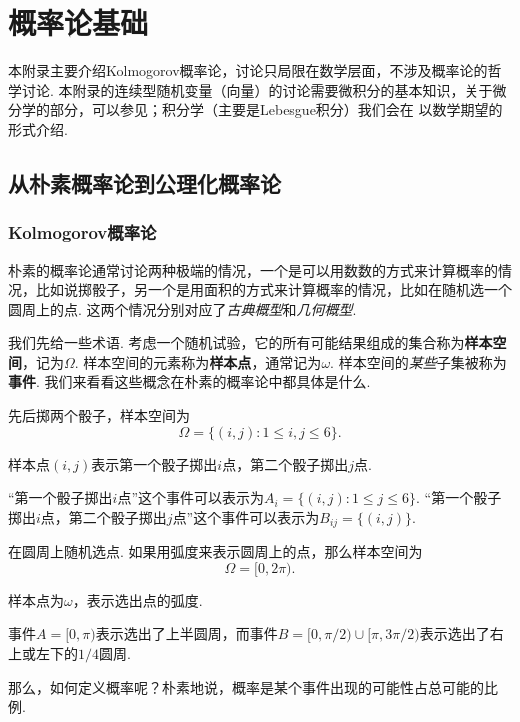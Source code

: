\chapter{概率论基础}\label{chap:prob}

本附录主要介绍Kolmogorov概率论，讨论只局限在数学层面，不涉及概率论的哲学讨论. 本附录的连续型随机变量（向量）的讨论需要微积分的基本知识，关于微分学的部分，可以参见；积分学（主要是Lebesgue积分）我们会在 以数学期望的形式介绍. 

\section{从朴素概率论到公理化概率论}

\subsection{Kolmogorov概率论}\label{subsec:kolmogorov-probability}
朴素的概率论通常讨论两种极端的情况，一个是可以用数数的方式来计算概率的情况，比如说掷骰子，另一个是用面积的方式来计算概率的情况，比如在随机选一个圆周上的点. 这两个情况分别对应了\textit{古典概型}和\textit{几何概型}. 

我们先给一些术语. 考虑一个随机试验，它的所有可能结果组成的集合称为\textbf{样本空间}，记为$\Omega$. 样本空间的元素称为\textbf{样本点}，通常记为$\omega$. 样本空间的\textit{某些}子集被称为\textbf{事件}. 我们来看看这些概念在朴素的概率论中都具体是什么. 

\begin{example}[古典概型]
先后掷两个骰子，样本空间为
\[
    \Omega = \{ (i, j): 1 \leq i, j \leq 6 \}.
\]

样本点$(i, j)$表示第一个骰子掷出$i$点，第二个骰子掷出$j$点. 

“第一个骰子掷出$i$点”这个事件可以表示为$A_i = \{ (i, j): 1 \leq j \leq 6 \}$. “第一个骰子掷出$i$点，第二个骰子掷出$j$点”这个事件可以表示为$B_{ij} = \{ (i, j) \}$.
\end{example}

\begin{example}[几何概型]
在圆周上随机选点. 如果用弧度来表示圆周上的点，那么样本空间为
\[
    \Omega = [0, 2\pi).
\]

样本点为$\omega$，表示选出点的弧度. 

事件$A = [0, \pi)$表示选出了上半圆周，而事件$B = [0, \pi/2)\cup[\pi, 3\pi/2)$表示选出了右上或左下的$1/4$圆周. 
\end{example}

那么，如何定义概率呢？朴素地说，概率是某个事件出现的可能性占总可能的比例. 

